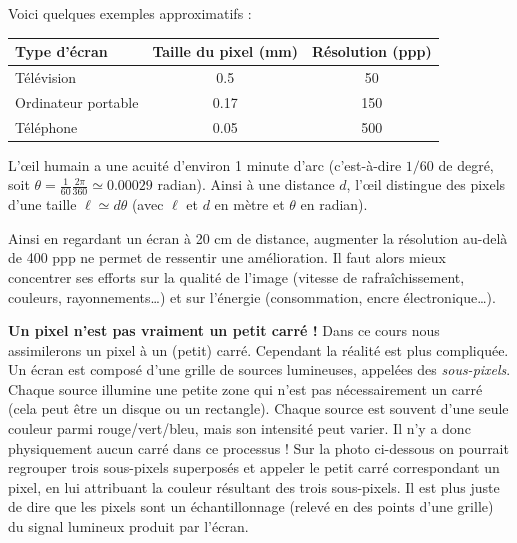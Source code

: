 \documentclass[11pt,class=report,crop=false]{standalone}
\begin{document}
Voici quelques exemples approximatifs :

\begin{center}
\begin{tabular}{lcc}
Type d'écran & Taille du pixel (mm) & Résolution (ppp) \\
\hline 
Télévision & 0.5 & 50 \\
Ordinateur portable & 0.17 & 150 \\ 
Téléphone & 0.05 & 500 \\
\end{tabular}
\end{center}

L'\oe il humain a une acuité d'environ 1 minute d'arc (c'est-à-dire $1/60$ de degré,  soit $\theta = \frac1{60}\frac{2\pi}{360} \simeq 0.00029$ radian).
Ainsi à une distance $d$, l'\oe il distingue des pixels d'une taille 
$\ell \simeq d \theta$ (avec $\ell$ et $d$ en mètre et $\theta$ en radian).


Ainsi en regardant un écran à 20 cm de distance, augmenter la résolution au-delà de 400 ppp ne permet de ressentir une amélioration.
Il faut alors mieux concentrer ses efforts sur la qualité de l'image (vitesse de rafraîchissement, couleurs, rayonnements\ldots) et sur l'énergie (consommation, 
encre électronique\ldots).

\bigskip

\textbf{Un pixel n'est pas vraiment un petit carré !}
Dans ce cours nous assimilerons un pixel à un (petit) carré.
Cependant la réalité est plus compliquée.
Un écran est composé d'une grille de sources lumineuses, appelées des \emph{sous-pixels}. Chaque source illumine une petite zone qui n'est pas nécessairement un carré (cela peut être un disque ou un rectangle). Chaque source est souvent d'une seule couleur parmi rouge/vert/bleu, mais son intensité peut varier. Il n'y a donc physiquement aucun carré dans ce processus !
Sur la photo ci-dessous on pourrait regrouper trois sous-pixels superposés et appeler le petit carré correspondant un pixel, en lui attribuant la couleur résultant des trois sous-pixels.
Il est plus juste de dire que les pixels sont un échantillonnage (relevé en des points d'une grille) du signal lumineux produit par l'écran.
\end{document}
